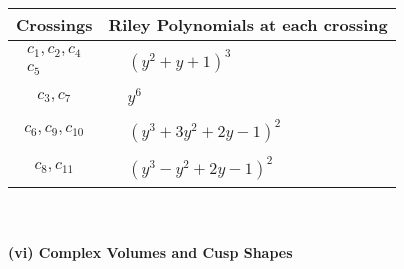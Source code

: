 \documentclass[1p]{elsarticle_modified}
\theoremstyle{definition}
\begin{document}
\begin{tabular}{m{50pt}|m{274pt}}
Crossings & \hspace{64pt}Riley Polynomials at each crossing \\
\hline $$\begin{aligned}c_{1},c_{2},c_{4}\\c_{5}\end{aligned}$$&$\begin{aligned}
&(y^2+y+1)^3
\end{aligned}$\\
\hline $$\begin{aligned}c_{3},c_{7}\end{aligned}$$&$\begin{aligned}
&y^6
\end{aligned}$\\
\hline $$\begin{aligned}c_{6},c_{9},c_{10}\end{aligned}$$&$\begin{aligned}
&(y^3+3 y^2+2 y-1)^2
\end{aligned}$\\
\hline $$\begin{aligned}c_{8},c_{11}\end{aligned}$$&$\begin{aligned}
&(y^3- y^2+2 y-1)^2
\end{aligned}$\\
\hline
\end{tabular}\\~\\
\newpage\flushleft \textbf{(vi) Complex Volumes and Cusp Shapes}
\end{document}

